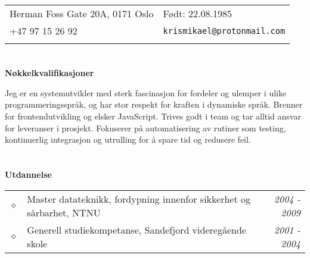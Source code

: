 \documentclass[overlapped,line,letterpaper]{res}
\begin{document}


\renewcommand{\namefont}{\large\textbf}



\begin{resume}

\begin{tabular}{ll}
  Herman Foss Gate 20A, 0171 Oslo       &Født: 22.08.1985\\
  +47 97 15 26 92		& \tt{krismikael@protonmail.com}\\
  &\\
\end{tabular}


\section{}
\textbf{Nøkkelkvalifikasjoner}\\
\makebox[\textwidth]{\hrulefill}

Jeg er en systemutvikler med sterk fascinasjon for fordeler og ulemper i ulike
programmeringsspråk, og har stor respekt for kraften i dynamiske språk. Brenner
for frontendutvikling og elsker JavaScript. Trives godt i team og tar alltid
ansvar for leveranser i prosjekt. Fokuserer på automatisering av rutiner som
testing, kontinuerlig integrasjon og utrulling for å spare tid og redusere
feil.


\section{}
\textbf{Utdannelse}\\
\makebox[\textwidth]{\hrulefill}

\begin{tabularx}{\textwidth}{lXr}
   $\diamond$	& Master datateknikk, fordypning innenfor sikkerhet og sårbarhet, {NTNU}	& \textit{2004 - 2009}\\
   $\diamond$	& Generell studiekompetanse, Sandefjord videregående skole				& \textit{2001 - 2004}\\
\end{tabularx}


\end{resume}
\end{document}
